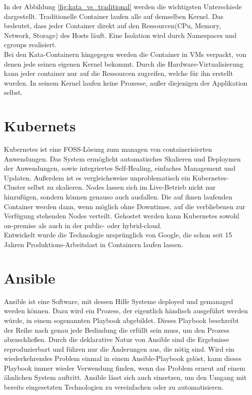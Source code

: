 In der Abbildung \ref{fig:kata_vs_traditional} werden die wichtigsten Unterschiede dargestellt.
Traditionelle Container laufen alle auf demselben Kernel. 
Das bedeutet, dass jeder Container direkt auf den Ressourcen(CPu, Memory, Network, Storage) des Hosts läuft. 
Eine Isolation wird durch Namespaces und cgroups realisiert.
\\
Bei den Kata-Containern hingegegen werden die Container in \ac{VM}s verpackt, von denen jede seinen eigenen Kernel bekommt.
Durch die Hardware-Virtualisierung kann jeder container nur auf die Ressourcen zugreifen, welche für ihn erstellt wurden. 
In seinem Kernel laufen keine Prozesse, außer diejenigen der Applikation selbst.  






\section{Kubernets}
Kubernetes ist eine \ac{FOSS}-Lösung zum managen von containerisierten Anwendungen.
Das System ermöglicht automatisches Skalieren und Deploymen der Anwendungen, sowie integriertes Self-Healing, einfaches Management und Updaten.
Außerdem ist es vergleichsweise unproblematisch ein Kubernetes-Cluster selbst zu skalieren. 
Nodes lassen sich im Live-Betrieb nicht nur hinzufügen, sondern können genauso auch ausfallen. 
Die auf ihnen laufenden Container werden dann, wenn möglich ohne Downtimes, auf die verbliebenen zur Verfügung stehenden Nodes verteilt. 
Gehostet werden kann Kubernetes sowohl on-premise als auch in der public- oder hybrid-cloud.
\\
Entwickelt wurde die Technologie ursprünglich von Google, die schon seit 15 Jahren Produktions-Arbeitslast in Containern laufen lassen.
\cite{kubernetes}




\section{Ansible}
Ansible ist eine Software, mit dessen Hilfe Systeme deployed und gemanaged werden können. 
Dazu wird ein Prozess, der eigentlich händisch ausgeführt werden würde, in einem sogenannten Playbook abgebildet.
Dieses Playbook beschreibt der Reihe nach genau jede Bedindung die erfüllt sein muss, um den Prozess abzuschließen.
Durch die deklarative Natur von Ansible sind die Ergebnisse reproduzierbart und führen nur die Änderungen aus, die nötig sind.
Wird ein wiederkehrendes Problem einmal in einem Ansible-Playbook gelöst, kann dieses Playbook immer wieder Verwendung finden, wenn das Problem erneut auf einem ähnlichen System auftritt.
Ansible lässt sich auch einsetzen, um den Umgang mit bereits eingesetzten Technologien zu vereinfachen oder zu automatisieren.
\cite{ansible}

